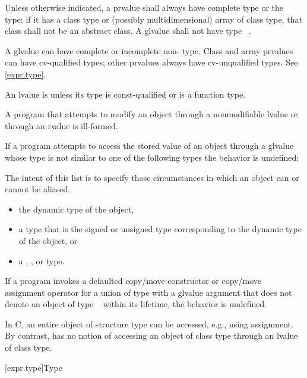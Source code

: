 \pnum
Unless otherwise indicated,
a prvalue shall always have complete type or the  type;
if it has a class type or (possibly multidimensional) array of class type,
that class shall not be an abstract class.
A glvalue shall not have type \cv{}~.
\begin{note}
A glvalue can have complete or incomplete non- type.
Class and array prvalues can have cv-qualified types; other prvalues
always have cv-unqualified types. See \ref{expr.type}.
\end{note}

\pnum
An lvalue is  unless its type is const-qualified
or is a function type.
\begin{note}
A program that attempts
to modify an object through a nonmodifiable lvalue or through an rvalue
is ill-formed.
\end{note}

\pnum
If a program attempts to access
the stored value of an object through a glvalue
whose type is not similar to
one of the following types the behavior is
undefined:
\begin{footnote}
The intent of this list is to specify those circumstances in which an
object can or cannot be aliased.
\end{footnote}
\begin{itemize}
\item the dynamic type of the object,

\item a type that is the signed or unsigned type corresponding to the
dynamic type of the object, or

\item a , , or  type.
\end{itemize}
If a program invokes
a defaulted copy/move constructor or copy/move assignment operator
for a union of type  with a glvalue argument
that does not denote an object of type \cv{}~ within its lifetime,
the behavior is undefined.
\begin{note}
In C, an entire object of structure type can be accessed, e.g., using assignment.
By contrast, \Cpp{} has no notion of accessing an object of class type
through an lvalue of class type.
\end{note}

[expr.type]{Type}

